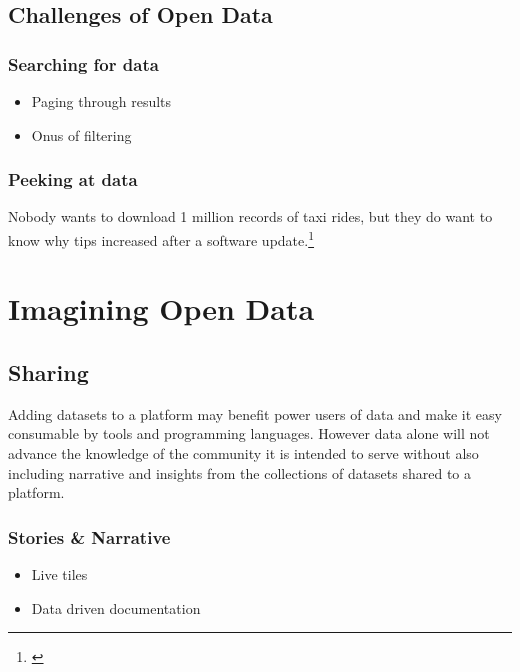 \documentclass[
]{book}
\providecommand{\tightlist}{%
  \setlength{\itemsep}{0pt}\setlength{\parskip}{0pt}}
\begin{document}
\hypertarget{challenges-of-open-data}{%
\section{Challenges of Open Data}\label{challenges-of-open-data}}

\hypertarget{searching-for-data}{%
\subsection{Searching for data}\label{searching-for-data}}

\begin{itemize}
\tightlist
\item
  Paging through results
\item
  Onus of filtering
\end{itemize}

\hypertarget{peeking-at-data}{%
\subsection{Peeking at data}\label{peeking-at-data}}

Nobody wants to download 1 million records of taxi rides, but they do want to know why tips increased after a software update.\footnote{\citet{iquantny2020}}

\hypertarget{imagine}{%
\chapter{Imagining Open Data}\label{imagine}}

\hypertarget{sharing}{%
\section{Sharing}\label{sharing}}

Adding datasets to a platform may benefit power users of data and make it easy consumable by tools and programming languages. However data alone will not advance the knowledge of the community it is intended to serve without also including narrative and insights from the collections of datasets shared to a platform.

\hypertarget{stories-narrative}{%
\subsection{Stories \& Narrative}\label{stories-narrative}}

\begin{itemize}
\tightlist
\item
  Live tiles
\item
  Data driven documentation
\end{itemize}
\end{document}
